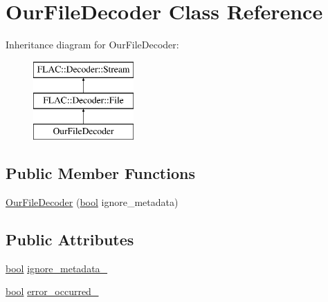 \hypertarget{class_our_file_decoder}{}\section{Our\+File\+Decoder Class Reference}
\label{class_our_file_decoder}
Inheritance diagram for Our\+File\+Decoder\+:\begin{figure}[H]
\begin{center}
\leavevmode
\includegraphics[height=3.000000cm]{class_our_file_decoder}
\end{center}
\end{figure}
\subsection*{Public Member Functions}
\begin{DoxyCompactItemize}
\item 
\hyperlink{class_our_file_decoder_a2293ea9ced115cdbac8dcadcfbce4a2c}{Our\+File\+Decoder} (\hyperlink{mac_2config_2i386_2lib-src_2libsoxr_2soxr-config_8h_abb452686968e48b67397da5f97445f5b}{bool} ignore\+\_\+metadata)
\end{DoxyCompactItemize}
\subsection*{Public Attributes}
\begin{DoxyCompactItemize}
\item 
\hyperlink{mac_2config_2i386_2lib-src_2libsoxr_2soxr-config_8h_abb452686968e48b67397da5f97445f5b}{bool} \hyperlink{class_our_file_decoder_a1b1df631dd2b9df31b2ce24f34b945bf}{ignore\+\_\+metadata\+\_\+}
\item 
\hyperlink{mac_2config_2i386_2lib-src_2libsoxr_2soxr-config_8h_abb452686968e48b67397da5f97445f5b}{bool} \hyperlink{class_our_file_decoder_ac842535a1ddabe5d84c87a31c1446fa2}{error\+\_\+occurred\+\_\+}
\end{DoxyCompactItemize}
